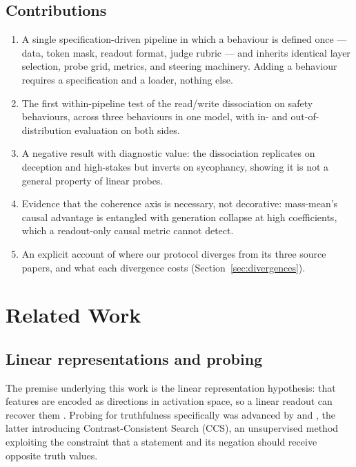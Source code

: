 \documentclass[conference]{IEEEtran}
\begin{document}
\subsection*{Contributions}

\begin{enumerate}
  \item A single specification-driven pipeline in which a behaviour is defined
    once --- data, token mask, readout format, judge rubric --- and inherits
    identical layer selection, probe grid, metrics, and steering machinery.
    Adding a behaviour requires a specification and a loader, nothing else.
  \item The first within-pipeline test of the read/write dissociation on safety
    behaviours, across three behaviours in one model, with in- and
    out-of-distribution evaluation on both sides.
  \item A negative result with diagnostic value: the dissociation replicates on
    deception and high-stakes but inverts on sycophancy, showing it is not a
    general property of linear probes.
  \item Evidence that the coherence axis is necessary, not decorative:
    mass-mean's causal advantage is entangled with generation collapse at high
    coefficients, which a readout-only causal metric cannot detect.
  \item An explicit account of where our protocol diverges from its three source
    papers, and what each divergence costs (Section~\ref{sec:divergences}).
\end{enumerate}

\section{Related Work}

\subsection{Linear representations and probing}

The premise underlying this work is the linear representation hypothesis: that
features are encoded as directions in activation space, so a linear readout can
recover them \citep{alain2018,elhage2022}. Probing for truthfulness specifically
was advanced by \citet{azaria2023} and \citet{burns2023}, the latter introducing
Contrast-Consistent Search (CCS), an unsupervised method exploiting the
constraint that a statement and its negation should receive opposite truth
values.
\end{document}
